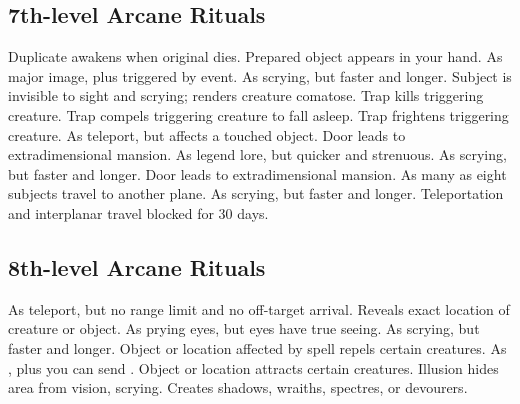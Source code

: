 \subsection{7th-level Arcane Rituals}
\begin{rituallist}
\F Duplicate awakens when original dies.
 Prepared object appears in your hand.
 As major image, plus triggered by event.
 As scrying, but faster and longer.
 Subject is invisible to sight and scrying; renders creature comatose.
 Trap kills triggering creature.
 Trap compels triggering creature to fall asleep.
 Trap frightens triggering creature.
 As teleport, but affects a touched object.
\F Door leads to extradimensional mansion.
 As legend lore, but quicker and strenuous.
 As scrying, but faster and longer.
\F Door leads to extradimensional mansion.
\F As many as eight subjects travel to another plane.
 As scrying, but faster and longer.
 Teleportation and interplanar travel blocked for 30 days.
\end{rituallist}

\subsection{8th-level Arcane Rituals}
\begin{rituallist}
 As teleport, but no range limit and no off-target arrival.
 Reveals exact location of creature or object.
 As prying eyes, but eyes have true seeing.
 As scrying, but faster and longer.
 Object or location affected by spell repels certain creatures.
 As , plus you can send .
\F Object or location attracts certain creatures.
 Illusion hides area from vision, scrying.
\M Creates shadows, wraiths, spectres, or devourers.
\end{rituallist}

